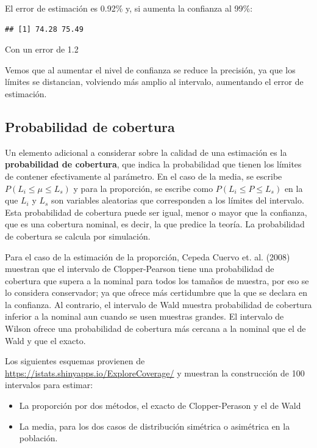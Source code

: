 \documentclass[]{book}
\providecommand{\tightlist}{%
  \setlength{\itemsep}{0pt}\setlength{\parskip}{0pt}}
\begin{document}
El error de estimación es 0.92\% y, si aumenta la confianza al 99\%:

\begin{verbatim}
## [1] 74.28 75.49
\end{verbatim}

Con un error de 1.2

Vemos que al aumentar el nivel de confianza se reduce la precisión, ya
que los límites se distancian, volviendo más amplio al intervalo, aumentando el error de estimación.

\hypertarget{probabilidad-de-cobertura}{%
\subsection{Probabilidad de cobertura}\label{probabilidad-de-cobertura}}

Un elemento adicional a considerar sobre la calidad de una estimación es la \textbf{probabilidad de cobertura}, que indica la probabilidad que tienen los límites de contener efectivamente al parámetro. En el caso de la media, se escribe \(P(L_{i}\leq \mu \leq L_{s})\) y para la proporción, se escribe como \(P(L_{i} \leq P \leq L_{s})\) en la que \(L_i\) y \(L_s\) son variables aleatorias que corresponden a los límites del intervalo. Esta probabilidad de cobertura puede ser igual, menor o mayor que la confianza, que es una cobertura nominal, es decir, la que predice la teoría. La probabilidad de cobertura se calcula por
simulación.

Para el caso de la estimación de la proporción, Cepeda Cuervo et. al. (2008) muestran que el intervalo de Clopper-Pearson tiene una probabilidad de cobertura que supera a la nominal para todos los tamaños de muestra, por eso se lo considera conservador; ya que ofrece más certidumbre que la que se declara en la
confianza. Al contrario, el intervalo de Wald muestra probabilidad de
cobertura inferior a la nominal aun cuando se usen muestras grandes. El
intervalo de Wilson ofrece una probabilidad de cobertura más cercana a
la nominal que el de Wald y que el exacto.

Los siguientes esquemas provienen de \url{https://istats.shinyapps.io/ExploreCoverage/} y muestran la construcción de 100 intervalos para estimar:

\begin{itemize}
\tightlist
\item
  La proporción por dos métodos, el exacto de Clopper-Perason y el de Wald
\item
  La media, para los dos casos de distribución simétrica o asimétrica en la población.
\end{itemize}
\end{document}
